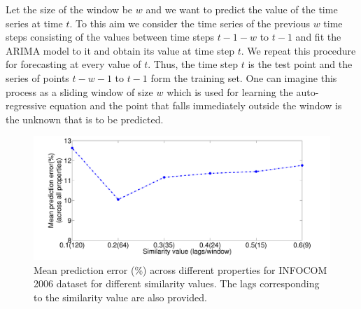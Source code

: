   Let the size of the window be $w$ and we want to predict the value of the time series at time $t$. To this aim we consider the time series of the previous $w$ 
  time steps consisting of the values between time steps $t-1-w$ to $t-1$ and fit the ARIMA model to it and obtain its value at time step $t$. 
 We repeat this procedure for forecasting at every value of $t$. Thus, the time step $t$ is the test point and the series of points $t-w-1$ to $t-1$ form the 
  training set. One can imagine this process as a sliding window of size $w$ which is used for learning the auto-regressive equation and the point that falls immediately 
  outside the window is the unknown that is to be predicted.
  
  \begin{figure}
 \begin{center}
  \includegraphics[width=0.75\columnwidth, angle=0]{./texfiles/Chapter_1/fig/error_similarity_val-eps-converted-to.pdf}
  \caption{\label{fig_err} Mean prediction error (\%) across different properties for INFOCOM 2006 dataset for different similarity values. The lags corresponding to the similarity 
  value are also provided.}
  \end{center}
 \end{figure}
  
